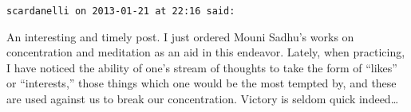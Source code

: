 \begin{footnotesize}\begin{sffamily}



\texttt{scardanelli on 2013-01-21 at 22:16 said: }

An interesting and timely post. I just ordered Mouni Sadhu's works on concentration and meditation as an aid in this endeavor. Lately, when practicing, I have noticed the ability of one's stream of thoughts to take the form of “likes” or “interests,” those things which one would be the most tempted by, and these are used against us to break our concentration. Victory is seldom quick indeed…


\end{sffamily}\end{footnotesize}
